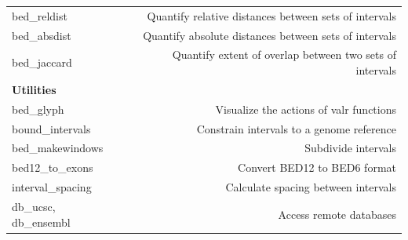 \documentclass[9pt,a4paper]{extarticle}
\begin{document}
\begin{table}[h!]
\begin{tabular}{lr}
  bed\_reldist & Quantify relative distances between sets of intervals \\
  bed\_absdist & Quantify absolute distances between sets of intervals \\
  bed\_jaccard &Quantify extent of overlap between two sets of intervals \\
\bfseries Utilities &  \\
  bed\_glyph & Visualize the actions of valr functions \\
  bound\_intervals & Constrain intervals to a genome reference \\
  bed\_makewindows & Subdivide intervals \\
  bed12\_to\_exons & Convert BED12 to BED6 format \\
  interval\_spacing & Calculate spacing between intervals \\
  db\_ucsc, db\_ensembl & Access remote databases \\
  \end{tabular}
\end{table}






\end{document}
